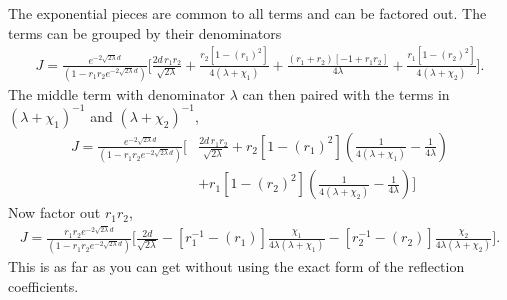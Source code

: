 The exponential pieces are common to all terms and can be factored out.  
The terms can be grouped by their denominators 
\begin{align}
  J=\frac{e^{-2\sqrt{2\lambda}d}}{(1-r_1r_2 e^{-2\sqrt{2\lambda}d})}
    \bigg[\frac{2d\,r_1r_2 }{\sqrt{2\lambda}}
  +\frac{r_2 [1 - (r_1)^2]}{4(\lambda+\chi_1)} 
     +\frac{(r_1 +r_2)[-1+r_1r_2]}
    {4\lambda}
    +\frac{r_1[1-(r_2)^2]}{4(\lambda+\chi_2)}\bigg].
  \end{align}
The middle term with denominator $\lambda$ can then paired with the terms in $(\lambda+\chi_1)^{-1}$
and $(\lambda+\chi_2)^{-1}$,
\begin{align}
  J=\frac{e^{-2\sqrt{2\lambda}d}}{(1-r_1r_2 e^{-2\sqrt{2\lambda}d})}
    \bigg[&\frac{2d\,r_1r_2 }{\sqrt{2\lambda}}
    +r_2 [1 - (r_1)^2]\left(\frac{1}{4(\lambda+\chi_1)}-\frac{1}{4\lambda} \right)\nonumber\\
    &+r_1[1-(r_2)^2]\left(\frac{1}{4(\lambda+\chi_2)}-\frac{1}{4\lambda}\right)\bigg]
  \end{align}
Now factor out $r_1r_2$,  
\begin{align*}
  J=\frac{r_1r_2e^{-2\sqrt{2\lambda}d}}{(1-r_1r_2 e^{-2\sqrt{2\lambda}d})}
    \bigg[\frac{2d}{\sqrt{2\lambda}}
    -[r_1^{-1} - (r_1)]\frac{\chi_1}{4\lambda(\lambda+\chi_1)}
    -[r_2^{-1}-(r_2)]\frac{\chi_2}{4\lambda(\lambda+\chi_2)}\bigg].
  \end{align*}
This is as far as you can get without using the exact form of the reflection coefficients.  
